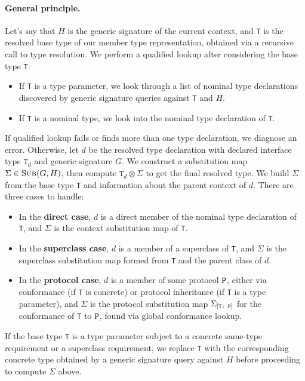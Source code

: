 \documentclass[../generics]{subfiles}
\begin{document}
\paragraph{General principle.} Let's say that $H$ is the generic signature of the current context, and \texttt{T} is the resolved base type of our member type representation, obtained via a recursive call to type resolution. We perform a qualified lookup after considering the base type \texttt{T}:
\begin{itemize}
\item If \texttt{T} is a type parameter, we look through a list of nominal type declarations discovered by generic signature queries against \texttt{T} and $H$.
\item If \texttt{T} is a nominal type, we look into the nominal type declaration of \texttt{T}.
\end{itemize}
If qualified lookup fails or finds more than one type declaration, we diagnose an error. Otherwise, let $d$ be the resolved type declaration with declared interface type $\texttt{T}_d$ and generic signature $G$. We construct a substitution map $\Sigma\in\textsc{Sub}({G, H})$, then compute $\texttt{T}_d\otimes\Sigma$ to get the final resolved type. We build $\Sigma$ from the base type \texttt{T} and information about the parent context of $d$. There are three cases to handle:
\begin{itemize}
\item In the \textbf{direct case}, $d$ is a direct member of the nominal type declaration of \texttt{T}, and $\Sigma$ is the context substitution map of \texttt{T}.
\item In the \textbf{superclass case}, $d$ is a member of a superclass of \texttt{T}, and $\Sigma$ is the superclass substitution map formed from \texttt{T} and the parent class of $d$.
\item In the \textbf{protocol case}, $d$ is a member of some protocol $\texttt{P}$, either via conformance (if \texttt{T} is concrete) or protocol inheritance (if \texttt{T} is a type parameter), and $\Sigma$ is the protocol substitution map $\Sigma_{[\texttt{T:~P}]}$ for the conformance of \texttt{T} to $\texttt{P}$, found via global conformance lookup.
\end{itemize}
If the base type \texttt{T} is a type parameter subject to a concrete same-type requirement or a superclass requirement, we replace \texttt{T} with the corresponding concrete type obtained by a generic signature query against $H$ before proceeding to compute $\Sigma$ above.
\end{document}
